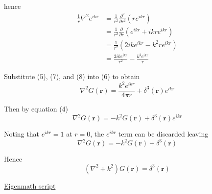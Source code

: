 hence
\begin{align*}
\frac{1}{r}\nabla^2e^{ikr}&=\frac{1}{r^2}\frac{\partial^2}{\partial r^2}\left(re^{ikr}\right)
\\
&=\frac{1}{r^2}\frac{\partial}{\partial r}\left(e^{ikr}+ikre^{ikr}\right)
\\
&=\frac{1}{r^2}\left(2ike^{ikr}-k^2re^{ikr}\right)
\\
&=\frac{2ike^{ikr}}{r^2}-\frac{k^2e^{ikr}}{r}
\tag{8}
\end{align*}

Substitute (5), (7), and (8) into (6) to obtain
\begin{equation*}
\nabla^2G(\mathbf r)=\frac{k^2e^{ikr}}{4\pi r}+\delta^3(\mathbf r)e^{ikr}
\end{equation*}

Then by equation (4)
\begin{equation*}
\nabla^2G(\mathbf r)=-k^2G(\mathbf r)+\delta^3(\mathbf r)e^{ikr}
\end{equation*}

Noting that $e^{ikr}=1$ at $r=0$, the $e^{ikr}$ term can be discarded leaving
\begin{equation*}
\nabla^2G(\mathbf r)=-k^2G(\mathbf r)+\delta^3(\mathbf r)
\tag{9}
\end{equation*}

Hence
\begin{equation*}
\left(\nabla^2+k^2\right)G(\mathbf r)=\delta^3(\mathbf r)
\end{equation*}

\href{https://georgeweigt.github.io/examples/greens-function-demo.html}{Eigenmath script}


